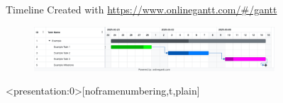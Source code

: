 \documentclass[aspectratio=169,xcolor=table]{beamer}
\newif\ifincludebackup
\begin{document}
\begin{frame}[c]{Timeline}
Created with \url{https://www.onlinegantt.com/\#/gantt}
    \begin{figure}
        \includegraphics[width=0.8\textwidth]{images/Online Gantt 20250228.pdf}
        \hfill
    \end{figure}  
\end{frame}


\begin{frame}<presentation:0>[noframenumbering,t,plain]
\end{frame}


\ifincludebackup

    \begin{frame}[c]{Backup Slides ifdesired
        \begin{itemize}
            \item ...
            \item ...
        \end{itemize}
    \end{frame}    
\fi
\end{document}

